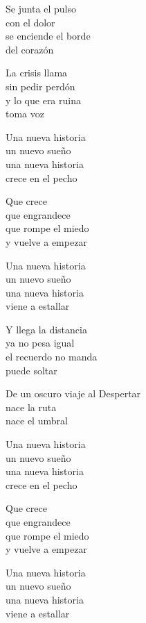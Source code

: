 \begin{lyrics}
Se junta el pulso\\
con el dolor\\
se enciende el borde\\
del corazón

La crisis llama\\
sin pedir perdón\\
y lo que era ruina\\
toma voz

Una nueva historia\\
un nuevo sueño\\
una nueva historia\\
crece en el pecho

Que crece\\
que engrandece\\
que rompe el miedo\\
y vuelve a empezar

Una nueva historia\\
un nuevo sueño\\
una nueva historia\\
viene a estallar

Y llega la distancia\\
ya no pesa igual\\
el recuerdo no manda\\
puede soltar

De un oscuro viaje al Despertar\\
nace la ruta\\
nace el umbral

Una nueva historia\\
un nuevo sueño\\
una nueva historia\\
crece en el pecho

Que crece\\
que engrandece\\
que rompe el miedo\\
y vuelve a empezar

Una nueva historia\\
un nuevo sueño\\
una nueva historia\\
viene a estallar
\end{lyrics}

